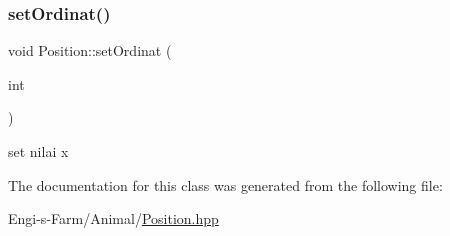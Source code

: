\subsubsection{\texorpdfstring{setOrdinat()}{setOrdinat()}}
{\footnotesize\ttfamily void Position\+::set\+Ordinat (\begin{DoxyParamCaption}\item[{int}]{ }\end{DoxyParamCaption})}

set nilai x 

The documentation for this class was generated from the following file\+:\begin{DoxyCompactItemize}
\item 
Engi-\/s-\/\+Farm/\+Animal/\mbox{\hyperlink{_position_8hpp}{Position.\+hpp}}\end{DoxyCompactItemize}

